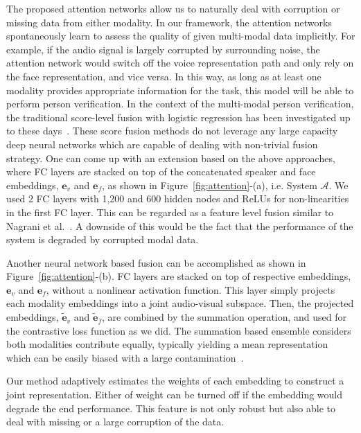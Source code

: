 \documentclass{article}
\begin{document}
The proposed attention networks allow us to naturally deal with corruption or missing data from either modality.
In our framework, the attention networks spontaneously learn to assess the quality of given multi-modal data implicitly.
For example, if the audio signal is largely corrupted by surrounding noise, the attention network would switch off the voice representation path and only rely on the face representation, and vice versa.
In this way, as long as at least one modality provides appropriate information for the task, this model will be able to perform person verification. 
In the context of the multi-modal person verification, the traditional score-level fusion with logistic regression has been investigated up to these days~\cite{Choudhury1999,Luque2006,Thomas2006,hazen07,Sargin2009,Sell2018multimodal}.
These score fusion methods do not leverage any large capacity deep neural networks which are capable of dealing with non-trivial fusion strategy.
One can come up with an extension based on the above approaches, where FC layers are stacked on top of the concatenated speaker and face embeddings, $\mathbf{e}_v$ and $\mathbf{e}_f$, as shown in Figure~\ref{fig:attention}-(a), i.e. System $\mathcal{A}$. We used 2 FC layers with 1,200 and 600 hidden nodes and ReLUs for non-linearities in the first FC layer. 
This can be regarded as a feature level fusion similar to Nagrani et al.~\cite{nagrani2018seeing}.
A downside of this would be the fact that the performance of the system is degraded by corrupted modal data.

Another neural network based fusion can be accomplished as shown in Figure~\ref{fig:attention}-(b). 
FC layers are stacked on top of respective embeddings, $\mathbf{e}_v$ and $\mathbf{e}_f$, without a nonlinear activation function. 
This layer simply projects each modality embeddings into a joint audio-visual subspace.  
Then, the projected embeddings, $\widetilde{\mathbf{e}}_v$ and $\widetilde{\mathbf{e}}_f$, are combined by the summation operation, and used for the contrastive loss function as we did.
The summation based ensemble considers both modalities contribute equally, typically yielding a mean representation which can be easily biased with a large contamination~\cite{candes2011robust}.

Our method adaptively estimates the weights of each embedding to construct a joint representation. Either of weight can be turned off if the embedding would degrade the end performance.
This feature is not only robust but also able to deal with missing or a large corruption of the data.
\end{document}
